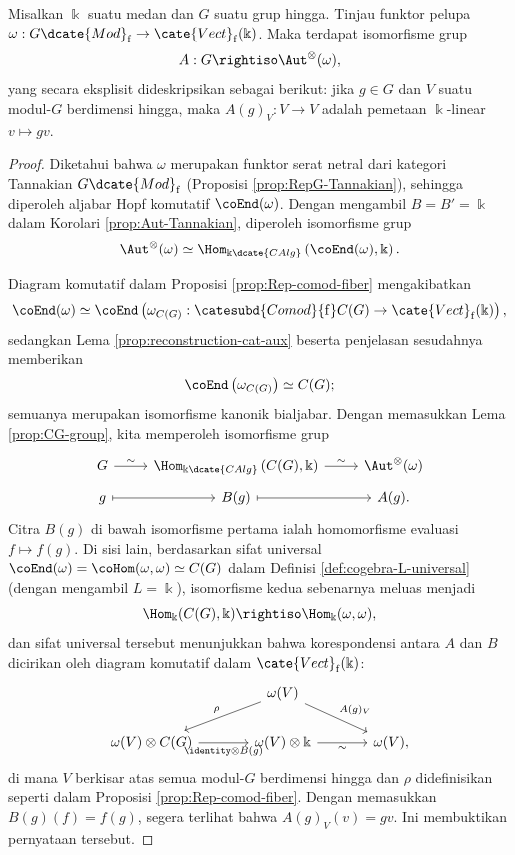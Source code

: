 \begin{theorem}\label{prop:Tannaka-Krein}
	Misalkan $\Bbbk$ suatu medan dan $G$ suatu grup hingga. Tinjau funktor pelupa $\omega: G\dcate{Mod}_{\mathrm{f}} \to \cate{Vect}_{\mathrm{f}}(\Bbbk)$. Maka terdapat isomorfisme grup
	\[ A: G \rightiso \Aut^\otimes(\omega), \]
	yang secara eksplisit dideskripsikan sebagai berikut: jika $g \in G$ dan $V$ suatu modul-$G$ berdimensi hingga, maka $A(g)_V: V \to V$ adalah pemetaan $\Bbbk$-linear $v \mapsto gv$.
\end{theorem}
\begin{proof}
	Diketahui bahwa $\omega$ merupakan funktor serat netral dari kategori
	Tannakian $G\dcate{Mod}_{\mathrm{f}}$
	(Proposisi \ref{prop:RepG-Tannakian}), sehingga diperoleh aljabar Hopf
	komutatif $\coEnd(\omega)$. Dengan mengambil $B = B' = \Bbbk$ dalam
	Korolari \ref{prop:Aut-Tannakian}, diperoleh isomorfisme grup
	\[ \Aut^{\otimes}(\omega) \simeq \Hom_{\Bbbk\dcate{CAlg}}\left(\coEnd(\omega), \Bbbk \right). \]

	Diagram komutatif dalam Proposisi \ref{prop:Rep-comod-fiber} mengakibatkan
	\[ \coEnd(\omega) \simeq \coEnd\left(\omega_{C(G)}: \catesubd{Comod}{\mathrm{f}}C(G) \to \cate{Vect}_{\mathrm{f}}(\Bbbk) \right), \]
	sedangkan Lema \ref{prop:reconstruction-cat-aux} beserta penjelasan sesudahnya memberikan
	\[ \coEnd\left( \omega_{C(G)} \right) \simeq C(G); \]
	semuanya merupakan isomorfisme kanonik bialjabar. Dengan memasukkan Lema \ref{prop:CG-group}, kita memperoleh isomorfisme grup
	\[\begin{tikzcd}[row sep=tiny]
		G \arrow[r, "\sim"] & \Hom_{\Bbbk\dcate{CAlg}}\left(C(G), \Bbbk \right) \arrow[r, "\sim"] & \Aut^{\otimes}(\omega) \\
		g \arrow[mapsto, r] & B(g) \arrow[mapsto, r] & A(g).
	\end{tikzcd}\]
	Citra $B(g)$ di bawah isomorfisme pertama ialah homomorfisme evaluasi
	$f \mapsto f(g)$. Di sisi lain, berdasarkan sifat universal
	$\coEnd(\omega) = \coHom(\omega, \omega) \simeq C(G)$ dalam
	Definisi \ref{def:cogebra-L-universal} (dengan mengambil $L = \Bbbk$),
	isomorfisme kedua sebenarnya meluas menjadi
	\[ \Hom_{\Bbbk}(C(G), \Bbbk) \rightiso \Hom_{\Bbbk}(\omega, \omega), \]
	dan sifat universal tersebut menunjukkan bahwa korespondensi antara $A$ dan $B$ dicirikan oleh diagram komutatif dalam $\cate{Vect}_{\mathrm{f}}(\Bbbk)$:
	\[\begin{tikzcd}[column sep=large]
		& \omega(V) \arrow[ld, "\rho"'] \arrow[rd, "{A(g)_V}"] & \\
		\omega(V) \otimes C(G) \arrow[r, "{\identity \otimes B(g)}"'] & \omega(V) \otimes \Bbbk \arrow[r, "\sim"'] & \omega(V),
	\end{tikzcd}\]
	di mana $V$ berkisar atas semua modul-$G$ berdimensi hingga dan $\rho$
	didefinisikan seperti dalam Proposisi \ref{prop:Rep-comod-fiber}. Dengan
	memasukkan $B(g)(f) = f(g)$, segera terlihat bahwa $A(g)_V(v) = gv$. Ini
	membuktikan pernyataan tersebut.
\end{proof}

